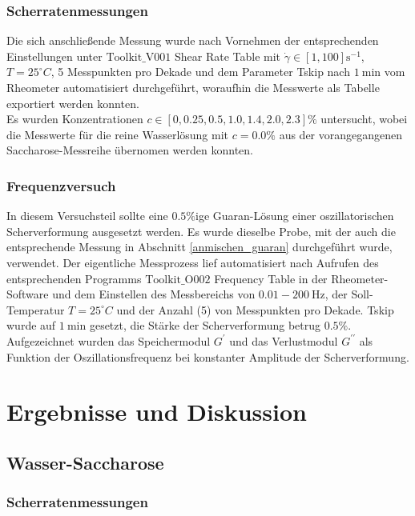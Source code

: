 \documentclass[11pt,a4paper,oneside]{scrartcl}
\begin{document}
\subsubsection{Scherratenmessungen}
Die sich anschließende Messung wurde nach Vornehmen der entsprechenden Einstellungen unter $\mathrm{Toolkit\_V001}$ Shear Rate Table mit $\dot\gamma\in[1,100]\mathrm s^{-1}$, $T=25^\circ C$, 5 Messpunkten pro Dekade und dem Parameter Tskip nach $1\ \mathrm{min}$ vom Rheometer automatisiert durchgeführt, woraufhin die Messwerte als Tabelle exportiert werden konnten.\\
Es wurden Konzentrationen $c\in[0,0.25,0.5,1.0,1.4,2.0,2.3]\%$ untersucht, wobei die Messwerte für die reine Wasserlösung mit $c=0.0\%$ aus der vorangegangenen Saccharose-Messreihe übernomen werden konnten.
\subsubsection{Frequenzversuch}
In diesem Versuchsteil sollte eine $0.5\%$ige Guaran-Lösung einer oszillatorischen Scherverformung ausgesetzt werden. Es wurde dieselbe Probe, mit der auch die entsprechende Messung in Abschnitt \ref{anmischen_guaran} durchgeführt wurde, verwendet. Der eigentliche Messprozess lief automatisiert nach Aufrufen des entsprechenden Programms $\mathrm{Toolkit\_O002}$ Frequency Table in der Rheometer-Software und dem Einstellen des Messbereichs von $0.01-200\ \mathrm{Hz}$, der Soll-Temperatur $T=25^\circ C$ und der Anzahl (5) von Messpunkten pro Dekade. Tskip wurde auf $1\ \mathrm{min}$ gesetzt, die Stärke der Scherverformung betrug $0.5\%$.\\
Aufgezeichnet wurden das Speichermodul $G^\prime$ und das Verlustmodul $G^{\prime\prime}$ als Funktion der Oszillationsfrequenz bei konstanter Amplitude der Scherverformung.
\section{Ergebnisse und Diskussion}
\subsection{Wasser-Saccharose}
\subsubsection{Scherratenmessungen}

\end{document}
